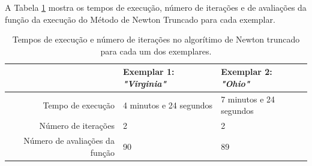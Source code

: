 A Tabela \ref{tab:temposexec2} mostra os tempos de execução, número de iterações e de avaliações da função da execução do Método de Newton Truncado para cada exemplar.

\begin{table}
	\caption{Tempos de execução e número de iterações no algorítimo de Newton truncado para cada um dos exemplares.}
	\label{tab:temposexec2}
	\begin{tabular}{r || l | l}
		 & Exemplar 1: \emph{"Virginia"} & Exemplar 2: \emph{"Ohio"} \\ \hline
		Tempo de execução & 4 minutos e 24 segundos & 7 minutos e 24 segundos\\ \hline
		Número de iterações & 2 & 2 \\ \hline
		Número de avaliações da função & 90 & 89
	\end{tabular}
\end{table}


